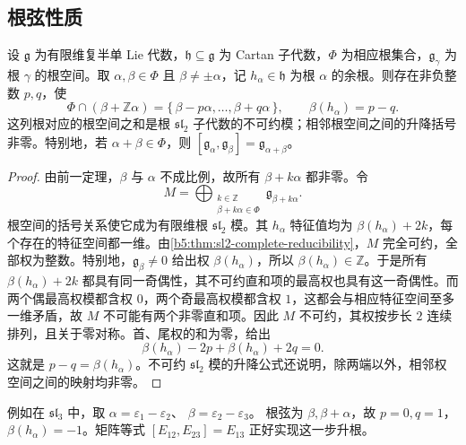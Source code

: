 \subsection{根弦性质}
\label{b5:subsec:1603:02}

\begin{theorem}[根弦]\label{b5:thm:root-string}
	设 \(\mathfrak g\) 为有限维复半单 Lie 代数，\(\mathfrak h\subseteq\mathfrak g\) 为 Cartan 子代数，\(\Phi\) 为相应根集合，\(\mathfrak g_\gamma\) 为根 \(\gamma\) 的根空间。取 \(\alpha,\beta\in\Phi\) 且 \(\beta\ne\pm\alpha\)，记 \(h_\alpha\in\mathfrak h\) 为根 \(\alpha\) 的余根。则存在非负整数 \(p,q\)，使
	\[
		\Phi\cap(\beta+\mathbb Z\alpha) =\{\,\beta-p\alpha,\ldots,\beta+q\alpha\,\}, \qquad \beta(h_\alpha)=p-q.
	\]
	这列根对应的根空间之和是根 \(\mathfrak{sl}_2\) 子代数的不可约模；相邻根空间之间的升降括号非零。特别地，若 \(\alpha+\beta\in\Phi\)，则 \([\mathfrak g_\alpha,\mathfrak g_\beta]=\mathfrak g_{\alpha+\beta}\)。
\end{theorem}
\begin{proof}
	由前一定理，\(\beta\) 与 \(\alpha\) 不成比例，故所有 \(\beta+k\alpha\) 都非零。令
	\[
		M=\bigoplus_{\substack{k\in\mathbb Z\\\beta+k\alpha\in\Phi}} \mathfrak g_{\beta+k\alpha}.
	\]
	根空间的括号关系使它成为有限维根 \(\mathfrak{sl}_2\) 模。其 \(h_\alpha\) 特征值均为 \(\beta(h_\alpha)+2k\)，每个存在的特征空间都一维。由\cref{b5:thm:sl2-complete-reducibility}，\(M\) 完全可约，全部权为整数。特别地，\(\mathfrak g_\beta\ne0\) 给出权 \(\beta(h_\alpha)\)，所以 \(\beta(h_\alpha)\in\mathbb Z\)。于是所有 \(\beta(h_\alpha)+2k\) 都具有同一奇偶性，其不可约直和项的最高权也具有这一奇偶性。而两个偶最高权模都含权 \(0\)，两个奇最高权模都含权 \(1\)，这都会与相应特征空间至多一维矛盾，故 \(M\) 不可能有两个非零直和项。因此 \(M\) 不可约，其权按步长 \(2\) 连续排列，且关于零对称。首、尾权的和为零，给出
	\[
		\beta(h_\alpha)-2p+\beta(h_\alpha)+2q=0.
	\]
	这就是 \(p-q=\beta(h_\alpha)\)。不可约 \(\mathfrak{sl}_2\) 模的升降公式还说明，除两端以外，相邻权空间之间的映射均非零。
\end{proof}

例如在 \(\mathfrak{sl}_3\) 中，取 \(\alpha=\varepsilon_1-\varepsilon_2\)、 \(\beta=\varepsilon_2-\varepsilon_3\)。 根弦为 \(\beta,\beta+\alpha\)，故 \(p=0,q=1\)， \(\beta(h_\alpha)=-1\)。矩阵等式 \([E_{12},E_{23}]=E_{13}\) 正好实现这一步升根。

